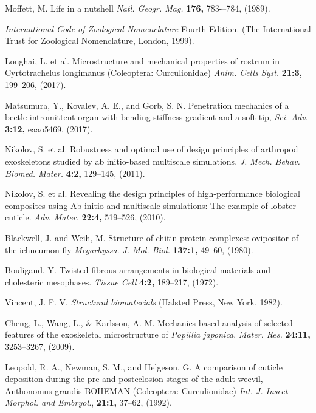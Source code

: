 \documentclass[twocolumn, linenumbers, superscriptaddress, nofootinbib]{revtex4-1}
\begin{document}
\begin{thebibliography}{50}
				Moffett, M.
				Life in a nutshell
				\textit{Natl. Geogr. Mag.}
				\textbf{176,}
				783-–784,
				(1989).
			
				\textit{International Code of Zoological Nomenclature}
				Fourth Edition. 
				(The International Trust for Zoological Nomenclature,
				London,
				1999).
			
				Longhai, L. et al.
				Microstructure and mechanical properties of rostrum in Cyrtotrachelus longimanus (Coleoptera: Curculionidae)
				\textit{Anim. Cells Syst.}
				\textbf{21:3,}
				199--206,
				(2017).
			
				Matsumura, Y., Kovalev, A. E., and Gorb, S. N.
				Penetration mechanics of a beetle intromittent organ with bending stiffness gradient and a soft tip,
				\textit{Sci. Adv.}
				\textbf{3:12,}
				eaao5469,
				(2017).
				
				Nikolov, S. et al.
				Robustness and optimal use of design principles of arthropod exoskeletons studied by ab initio-based multiscale simulations.
				\textit{J. Mech. Behav. Biomed. Mater.}
				\textbf{4:2,}
				129--145,
				(2011).
			
				Nikolov, S. et al.
				Revealing the design principles of high-performance biological composites using Ab initio and multiscale simulations: The example of lobster cuticle.
				\textit{Adv. Mater.}
				\textbf{22:4,}
				519--526,
				(2010).
			
				Blackwell, J. and Weih, M.
				Structure of chitin-protein complexes: ovipositor of the ichneumon fly \textit{Megarhyssa}.
				\textit{J. Mol. Biol.}
				\textbf{137:1,}
				49--60,
				(1980).
			
				Bouligand, Y.
				Twisted fibrous arrangements in biological materials and cholesteric mesophases.
				\textit{Tissue Cell}
				\textbf{4:2,}
				189--217,
				(1972).
			
				Vincent, J. F. V.
				\textit{Structural biomaterials}
				(Halsted Press,
				New York,
				1982).
			
				Cheng, L., Wang, L., \& Karlsson, A. M.
				Mechanics-based analysis of selected features of the exoskeletal microstructure of \textit{Popillia japonica}.
				\textit{Mater. Res.}
				\textbf{24:11,}
				3253--3267,
				(2009).			
			
				Leopold, R. A., Newman, S. M., and Helgeson, G.
				A comparison of cuticle deposition during the pre-and posteclosion stages of the adult weevil, Anthonomus grandis BOHEMAN (Coleoptera: Curculionidae)
				\textit{Int. J. Insect Morphol. and Embryol.},
				\textbf{21:1,}
				37--62,
				(1992).
			

\end{thebibliography}
\end{document}
